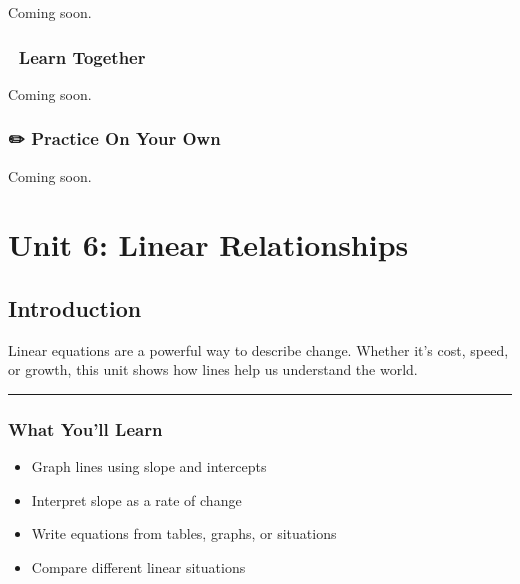 \documentclass[
  letterpaper,
]{scrrept}
\providecommand{\tightlist}{%
  \setlength{\itemsep}{0pt}\setlength{\parskip}{0pt}}
\begin{document}

Coming soon.

\section*{🧠 Learn Together}\label{learn-together-25}


Coming soon.

\section*{✏️ Practice On Your Own}\label{practice-on-your-own-25}


Coming soon.

\part{Unit 6: Linear Relationships}

\chapter*{Introduction}\label{introduction-5}


Linear equations are a powerful way to describe change. Whether it's
cost, speed, or growth, this unit shows how lines help us understand the
world.

\begin{center}\rule{0.5\linewidth}{0.5pt}\end{center}

\section*{What You'll Learn}\label{what-youll-learn-4}


\begin{itemize}
\tightlist
\item
  Graph lines using slope and intercepts
\item
  Interpret slope as a rate of change
\item
  Write equations from tables, graphs, or situations
\item
  Compare different linear situations
\end{itemize}
\end{document}
